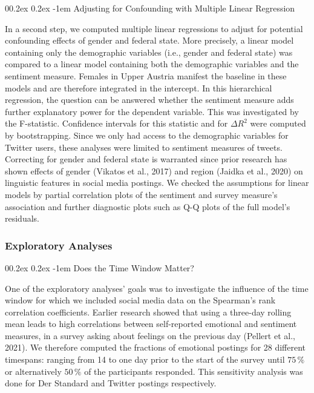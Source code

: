 \documentclass[
  english,
  jou,floatsintext]{apa7}
\makeatletter
\let\oldparagraph\paragraph
\renewcommand{\paragraph}[1]{\oldparagraph{#1}\mbox{}}
\renewcommand{\paragraph}{\@startsection{paragraph}{4}{\parindent}%
  {0\baselineskip \@plus 0.2ex \@minus 0.2ex}%
  {-1em}%
  {\normalfont\normalsize\bfseries\itshape\typesectitle}}
\makeatother
\begin{document}
\hypertarget{adjusting-for-confounding-with-multiple-linear-regression}{%
\paragraph{Adjusting for Confounding with Multiple Linear Regression}\label{adjusting-for-confounding-with-multiple-linear-regression}}

In a second step, we computed multiple linear regressions to adjust for potential confounding effects of gender and federal state. More precisely, a linear model containing only the demographic variables (i.e., gender and federal state) was compared to a linear model containing both the demographic variables and the sentiment measure. Females in Upper Austria manifest the baseline in these models and are therefore integrated in the intercept. In this hierarchical regression, the question can be answered whether the sentiment measure adds further explanatory power for the dependent variable. This was investigated by the F-statistic. Confidence intervals for this statistic and for \(\Delta R^2\) were computed by bootstrapping. Since we only had access to the demographic variables for Twitter users, these analyses were limited to sentiment measures of tweets. Correcting for gender and federal state is warranted since prior research has shown effects of gender (Vikatos et al., 2017) and region (Jaidka et al., 2020) on linguistic features in social media postings. We checked the assumptions for linear models by partial correlation plots of the sentiment and survey measure's association and further diagnostic plots such as Q-Q plots of the full model's residuals.

\hypertarget{exploratory-analyses}{%
\subsubsection{Exploratory Analyses}\label{exploratory-analyses}}

\hypertarget{does-the-time-window-matter}{%
\paragraph{Does the Time Window Matter?}\label{does-the-time-window-matter}}

One of the exploratory analyses' goals was to investigate the influence of the time window for which we included social media data on the Spearman's rank correlation coefficients. Earlier research showed that using a three-day rolling mean leads to high correlations between self-reported emotional and sentiment measures, in a survey asking about feelings on the previous day (Pellert et al., 2021). We therefore computed the fractions of emotional postings for 28 different timespans: ranging from 14 to one day prior to the start of the survey until \(75\,\%\) or alternatively \(50\,\%\) of the participants responded. This sensitivity analysis was done for Der Standard and Twitter postings respectively.
\end{document}
